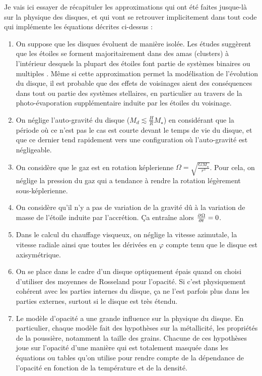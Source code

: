 Je vais ici essayer de récapituler les approximations qui ont été faites jusque-là sur la physique des disques, et qui vont se retrouver implicitement dans tout code qui implémente les équations décrites ci-dessus : 
\begin{enumerate}
\item On suppose que les disques évoluent de manière isolée. Les études suggèrent que les étoiles se forment majoritairement dans des amas (clusters) à l'intérieur desquels la plupart des étoiles font partie de systèmes binaires ou multiples \citep{duquennoy1991multiplicity}. Même si cette approximation permet la modélisation de l'évolution du disque, il est probable que des effets de voisinages aient des conséquences dans tout ou partie des systèmes stellaires, en particulier au travers de la photo-évaporation supplémentaire induite par les étoiles du voisinage.
\item On néglige l'auto-gravité du disque ($M_d \lesssim \frac{H}{R}M_\star$) en considérant que la période où ce n'est pas le cas est courte devant le temps de vie du disque, et que ce dernier tend rapidement vers une configuration où l'auto-gravité est négligeable.
\item On considère que le gaz est en rotation képlerienne $\Omega=\sqrt{\frac{GM_\star}{r^3}}$. Pour cela, on néglige la pression du gaz qui a tendance à rendre la rotation légèrement sous-képlerienne.
\item On considère qu'il n'y a pas de variation de la gravité dû à la variation de masse de l'étoile induite par l'accrétion. Ça entraîne alors $\pd{\Omega}{t} = 0$.
\item Dans le calcul du chauffage visqueux, on néglige la vitesse azimutale, la vitesse radiale ainsi que toutes les dérivées en $\varphi$ compte tenu que le disque est axisymétrique.
\item On se place dans le cadre d'un disque optiquement épais quand on choisi d'utiliser des moyennes de Rosseland pour l'opacité. Si c'est physiquement cohérent avec les parties internes du disque, ça ne l'est parfois plus dans les parties externes, surtout si le disque est très étendu.
\item Le modèle d'opacité a une grande influence sur la physique du disque. En particulier, chaque modèle fait des hypothèses sur la métallicité, les propriétés de la poussière, notamment la taille des grains. Chacune de ces hypothèses joue sur l'opacité d'une manière qui est totalement masquée dans les équations ou tables qu'on utilise pour rendre compte de la dépendance de l'opacité en fonction de la température et de la densité.

\end{enumerate}
